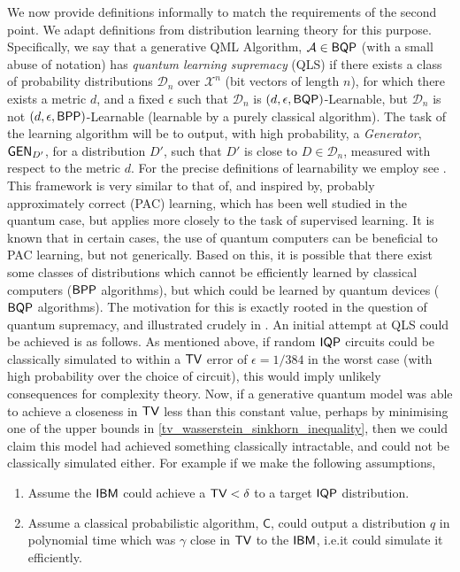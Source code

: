 We now provide definitions informally to match the requirements of the second point. We adapt definitions from distribution learning theory\cite{kearns_learnability_1994} for this purpose. Specifically, we say that a generative QML Algorithm, $\mathcal{A}\in \textsf{BQP}$ (with a small abuse of notation) has %
\textit{quantum learning supremacy} (QLS) if there exists a class of probability distributions 
$\mathcal{D}_n$ over $\mathcal X^n$ (bit vectors of length $n$), 
for which there exists a metric $d$, and a fixed $\epsilon$ such that $\mathcal{D}_n$ is $\left( d ,\epsilon, \textsf{BQP} \right)$-Learnable, but $\mathcal{D}_n$ is not $\left( d ,\epsilon, \textsf{BPP} \right)$-Learnable (learnable by a purely classical algorithm). The task of the learning algorithm will be to output, with high probability, a \textit{Generator}, $\operatorname{\textsf{GEN}}_{D'}$, for a distribution $D'$, such that $D'$ is close to $D \in \mathcal{D}_n$, measured with respect to the metric $d$. For the precise definitions of learnability we employ see .
This framework is very similar to that of, and inspired by, probably approximately correct (PAC) learning, which has been well studied in the quantum case\cite{arunachalam_survey_2017}, but applies more closely to the task of supervised learning. It is known that in certain cases, the use of quantum computers can be beneficial to PAC learning, but not generically\cite{arunachalam_quantum_2019}. Based on this, it is possible that there exist some classes of distributions which cannot be efficiently learned by classical computers ($\textsf{BPP}$ algorithms), but which could be learned by quantum devices ($\textsf{BQP}$ algorithms). The motivation for this is exactly rooted in the question of quantum supremacy, and illustrated crudely in . An initial attempt at QLS could be achieved is as follows. As mentioned above, if random $\operatorname{\textsf{IQP}}$ circuits could be classically simulated to within a $\operatorname{\textsf{TV}}$ error of $\epsilon = 1/384$\cite{bremner_average-case_2016} in the worst case (with high probability over the choice of circuit), this would imply unlikely consequences for complexity theory. Now, if a generative quantum model was able to achieve a closeness in $\operatorname{\textsf{TV}}$ less than this constant value, perhaps by minimising one of the upper bounds in \eqref{tv_wasserstein_sinkhorn_inequality}, then we could claim this model had achieved something classically intractable, and could not be classically simulated either. For example if we make the following assumptions,
\begin{enumerate}
    \item Assume the $\textsf{IBM}$ could achieve a $\operatorname{\textsf{TV}} < \delta$ to a target $\operatorname{\textsf{IQP}}$ distribution. 
    \item Assume a classical probabilistic algorithm, $\mathsf{C}$, could output a distribution $q$ in polynomial time which was $\gamma$ close in $\operatorname{\textsf{TV}}$ to the $\textsf{IBM}$, i.e.\@ it could simulate it efficiently.
\end{enumerate}
